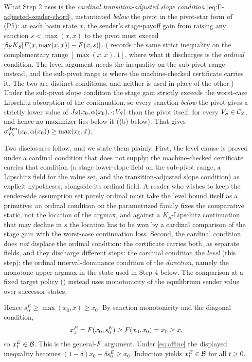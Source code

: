 What Step 2 uses is the \emph{cardinal transition-adjusted slope condition}
\eqref{eq:F-adjusted-sender-chord}, instantiated \emph{below} the
pivot in the pivot-star form of (P5): at each basin state $x$, the sender's
stage-payoff gain from raising any sanction $s<\max(x,\bar x)$ to the pivot
must exceed $\beta_S K_S|F(x,\max(x,\bar x))-F(x,s)|$.
( records the same
strict inequality on the complementary range $[\max(x,\bar
x),1]$, where what it discharges is the \emph{ordinal} condition. The
level argument needs the inequality on the sub-pivot range instead,
and the sub-pivot range is where the machine-checked certificate
carries it. The two are distinct conditions, and neither is used in
place of the other.) Under the sub-pivot slope condition the stage gain strictly
exceeds the worst-case Lipschitz absorption of the continuation, so
every sanction \emph{below} the pivot gives a strictly lower value of
$J_S(x_0,\alpha(x_0),\cdot;V_S)$ than the pivot itself, for every
$V_S\in\mathcal C_S$, and hence no maximizer lies below it
((b) below). That gives
$\sigma^{\mathrm{dyn}}_{V_S}(x_0,\alpha(x_0))\ge\max(x_0,\bar x)$.

Two disclosures follow, and we state them plainly. First, the level
clause is proved under a cardinal condition that 
does not supply; the machine-checked certificate carries that
condition (a stage lower-slope field on the sub-pivot range, a
Lipschitz field for the value set, and the transition-adjusted slope condition) as explicit
hypotheses, alongside its ordinal field. A reader who wishes to keep
the sender-side assumption set purely ordinal must take the level
bound itself as a primitive: an ordinal condition on the parametrized
family fixes the comparative static, not the location of the argmax,
and against a $K_S$-Lipschitz continuation that may decline in $s$ the
location has to be won by a cardinal comparison of the stage gain with
the worst-case continuation loss. Second, the cardinal condition does
\emph{not} displace the ordinal condition: the certificate carries
both, as separate fields, and they discharge different steps: the
cardinal condition the \emph{level} (this step); the ordinal interval-dominance
condition of  the \emph{direction}, namely the monotone
upper argmax in the state used in Step 4 below. The comparison at a
fixed target policy () instead uses monotonicity of the
equilibrium sender value over successor states.

Hence $s^E_0\ge\max(x_0,\bar x)\ge x_0$. By sanction monotonicity and
the diagonal condition,
\[
x^E_1=F(x_0,s^E_0)\ge F(x_0,x_0)=x_0\ge\bar x,
\]
so $x^E_1\in\mathcal{B}$. This is the general-$F$ argument. Under
\eqref{eq:affine} the displayed inequality becomes
$(1-\delta)x_0+\delta s^E_0\ge x_0$. Induction yields
$x^E_t\in\mathcal{B}$ for all $t\ge0$.

